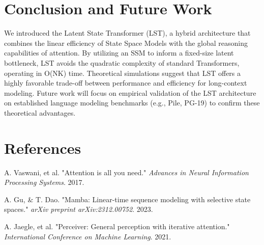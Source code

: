 \documentclass[10pt,twocolumn,letterpaper]{article}
\begin{document}
\section{Conclusion and Future Work}

We introduced the Latent State Transformer (LST), a hybrid architecture that combines the linear efficiency of State Space Models with the global reasoning capabilities of attention. By utilizing an SSM to inform a fixed-size latent bottleneck, LST avoids the quadratic complexity of standard Transformers, operating in O(NK) time. Theoretical simulations suggest that LST offers a highly favorable trade-off between performance and efficiency for long-context modeling. Future work will focus on empirical validation of the LST architecture on established language modeling benchmarks (e.g., Pile, PG-19) to confirm these theoretical advantages.

\section*{References}

\small


\begin{thebibliography}{9}

A. Vaswani, et al. "Attention is all you need." \textit{Advances in Neural Information Processing Systems}. 2017.

A. Gu, & T. Dao. "Mamba: Linear-time sequence modeling with selective state spaces." \textit{arXiv preprint arXiv:2312.00752}. 2023.

A. Jaegle, et al. "Perceiver: General perception with iterative attention." \textit{International Conference on Machine Learning}. 2021.

\end{thebibliography}
\end{document}
